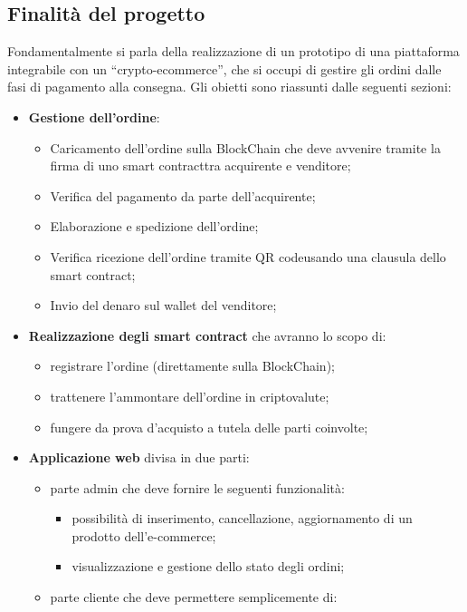 \subsection{Finalità del progetto}
Fondamentalmente si parla della realizzazione di un prototipo di una piattaforma integrabile con un “crypto-ecommerce”\glo, che si occupi di gestire gli ordini dalle fasi di pagamento alla consegna.
\newline
Gli obietti sono riassunti dalle seguenti sezioni:
\begin{itemize}
	\item \textbf{Gestione dell'ordine}:
		\begin{itemize}
			\item Caricamento dell'ordine sulla BlockChain che deve avvenire tramite la firma di uno {smart contract}\glo tra acquirente e venditore;
			\item Verifica del pagamento da parte dell'acquirente;
			\item Elaborazione e spedizione dell'ordine;
			\item Verifica ricezione dell'ordine tramite QR code\glo usando una clausula dello smart contract;
			\item Invio del denaro sul wallet del venditore;
		\end{itemize}
	\item \textbf{Realizzazione degli smart contract} che avranno lo scopo di:
		\begin{itemize}
			\item registrare l'ordine (direttamente sulla BlockChain);
			\item trattenere l'ammontare dell'ordine in criptovalute;
			\item fungere da prova d'acquisto a tutela delle parti coinvolte;
		\end{itemize}
	\item \textbf{Applicazione web} divisa in due parti:
		\begin{itemize}
			\item parte admin che deve fornire le seguenti funzionalità:
			\begin{itemize}
				\item possibilità di inserimento, cancellazione, aggiornamento di un prodotto dell'e-commerce;
				\item visualizzazione e gestione dello stato degli ordini;
			\end{itemize}
			\item parte cliente che deve permettere semplicemente di:

\end{itemize}
\end{itemize}
